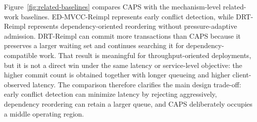 \documentclass[fleqn,10pt,lineno]{wlpeerj}
\begin{document}
\begin{table}[!htbp]
\centering
\small
\caption{Configuration robustness.}
\label{tab:robustness-detail}
\end{table}

\FloatBarrier

Figure~\ref{fig:related-baselines} compares CAPS with the mechanism-level related-work baselines. ED-MVCC-Reimpl represents early conflict detection, while DRT-Reimpl represents dependency-oriented reordering without pressure-adaptive admission. DRT-Reimpl can commit more transactions than CAPS because it preserves a larger waiting set and continues searching it for dependency-compatible work. That result is meaningful for throughput-oriented deployments, but it is not a direct win under the same latency or service-level objective: the higher commit count is obtained together with longer queueing and higher client-observed latency. The comparison therefore clarifies the main design trade-off: early conflict detection can minimize latency by rejecting aggressively, dependency reordering can retain a larger queue, and CAPS deliberately occupies a middle operating region.
\end{document}

